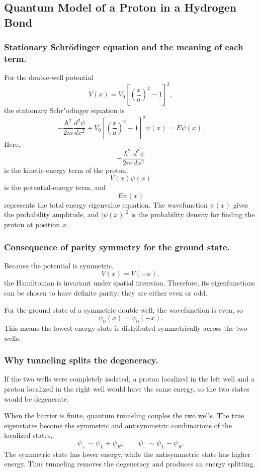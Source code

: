 \documentclass[12pt,a4paper]{article}
\begin{document}
\subsection{Quantum Model of a Proton in a Hydrogen Bond}

\subsubsection{Stationary Schr\"odinger equation and the meaning of each term.}
For the double-well potential
\[
  V(x)=V_0\left[\left(\frac{x}{a}\right)^2-1\right]^2,
\]
the stationary Schr"odinger equation is
\[
  -\frac{\hbar^2}{2m}\frac{d^2\psi}{dx^2}+V_0\left[\left(\frac{x}{a}\right)^2-1\right]^2\psi(x)=E\psi(x).
\]
Here,
\[
  -\frac{\hbar^2}{2m}\frac{d^2\psi}{dx^2}
\]
is the kinetic-energy term of the proton,
\[
  V(x)\psi(x)
\]
is the potential-energy term, and
\[
  E\psi(x)
\]
represents the total energy eigenvalue equation. The wavefunction $\psi(x)$ gives the probability amplitude, and $|\psi(x)|^2$ is the probability density for finding the proton at position $x$.

\subsubsection{Consequence of parity symmetry for the ground state.}
Because the potential is symmetric,
\[
  V(x)=V(-x),
\]
the Hamiltonian is invariant under spatial inversion. Therefore, its eigenfunctions can be chosen to have definite parity: they are either even or odd.

For the ground state of a symmetric double well, the wavefunction is even, so
\[
  \psi_0(x)=\psi_0(-x).
\]
This means the lowest-energy state is distributed symmetrically across the two wells.

\subsubsection{Why tunneling splits the degeneracy.}
If the two wells were completely isolated, a proton localized in the left well and a proton localized in the right well would have the same energy, so the two states would be degenerate.

When the barrier is finite, quantum tunneling couples the two wells. The true eigenstates become the symmetric and antisymmetric combinations of the localized states,
\[
  \psi_{+}\sim \psi_L+\psi_R,
  \qquad
  \psi_{-}\sim \psi_L-\psi_R.
\]
The symmetric state has lower energy, while the antisymmetric state has higher energy. Thus tunneling removes the degeneracy and produces an energy splitting.
\end{document}
